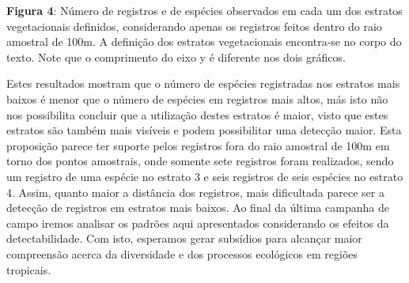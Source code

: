 \textbf{Figura 4}: Número de registros e de espécies observados em cada um dos estratos vegetacionais definidos, considerando apenas os registros feitos dentro do raio amostral de 100m. A definição dos estratos vegetacionais encontra-se no corpo do texto. Note que o comprimento do eixo y é diferente nos dois gráficos.

Estes resultados mostram que o número de espécies registradas nos estratos mais baixos é menor que o número de espécies em registros mais altos, más isto não nos possibilita concluir que a utilização destes estratos é maior, visto que estes estratos são também mais visíveis e podem possibilitar uma detecção maior. Esta proposição parece ter suporte pelos registros fora do raio amostral de 100m em torno dos pontos amostrais, onde somente sete registros foram realizados, sendo um registro de uma espécie no estrato 3 e seis registros de seis espécies no estrato 4. Assim, quanto maior a distância dos registros, mais dificultada parece ser a detecção de registros em estratos mais baixos. Ao final da última campanha de campo iremos analisar os padrões aqui apresentados considerando os efeitos da detectabilidade. Com isto, esperamos gerar subsídios para alcançar maior compreensão acerca da diversidade e dos processos ecológicos em regiões tropicais.